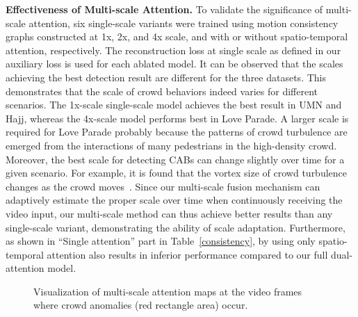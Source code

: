 \documentclass[journal]{IEEEtran}
\begin{document}
\vskip 0.02in
\noindent \textbf{Effectiveness of Multi-scale Attention.}
To validate the significance of multi-scale attention, six single-scale variants were trained using motion consistency graphs constructed at 1x, 2x, and 4x scale, and with or without spatio-temporal attention, respectively. The reconstruction loss at single scale as defined in our auxiliary loss is used for each ablated model. It can be observed that the scales achieving the best detection result are different for the three datasets. This demonstrates that the scale of crowd behaviors indeed varies for different scenarios. The 1x-scale single-scale model achieves the best result in UMN and Hajj, whereas the 4x-scale model performs best in Love Parade. A larger scale is required for Love Parade probably because the patterns of crowd turbulence are emerged from the interactions of many pedestrians in the high-density crowd. Moreover, the best scale for detecting CABs can change slightly over time for a given scenario. For example, it is found that the vortex size of crowd turbulence changes as the crowd moves~\cite{ivancevic2012turbulence}. Since our multi-scale fusion mechanism can adaptively estimate the proper scale over time when continuously receiving the video input, our multi-scale method can thus achieve better results than any single-scale variant, demonstrating the ability of scale adaptation. Furthermore, as shown in “Single attention” part in Table~\ref{consistency}, by using only spatio-temporal attention also results in inferior performance compared to our full dual-attention model. 

\begin{figure}[t]
\centering
    
    
    \caption{
        Visualization of multi-scale attention maps at the video frames where crowd anomalies (red rectangle area) occur.
}
\label{multi_scale}
\end{figure}
\end{document}
